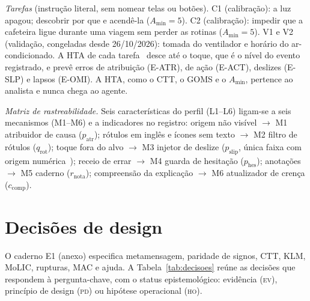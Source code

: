 \documentclass[conference]{IEEEtran}
\newcommand{\stEV}{\textsc{ev}}
\newcommand{\stPD}{\textsc{pd}}
\newcommand{\stHO}{\textsc{ho}}
\begin{document}
\textit{Tarefas} (instrução literal, sem nomear telas ou botões). C1 (calibração): a luz apagou; descobrir por que e acendê-la ($A_{\min}=5$). C2 (calibração): impedir que a cafeteira ligue durante uma viagem sem perder as rotinas ($A_{\min}=5$). V1 e V2 (validação, congeladas desde 26/10/2026): tomada do ventilador e horário do ar-condicionado. A HTA de cada tarefa~\cite{annett1967} desce até o toque, que é o nível do evento registrado, e prevê erros de atribuição (E-ATR), de ação (E-ACT), deslizes (E-SLP) e lapsos (E-OMI). A HTA, como o CTT, o GOMS e o $A_{\min}$, pertence ao analista e nunca chega ao agente.

\textit{Matriz de rastreabilidade.} Seis características do perfil (L1--L6) ligam-se a seis mecanismos (M1--M6) e a indicadores no registro: origem não visível $\rightarrow$ M1 atribuidor de causa ($p_{\mathrm{atr}}$); rótulos em inglês e ícones sem texto $\rightarrow$ M2 filtro de rótulos ($q_{\mathrm{rot}}$); toque fora do alvo $\rightarrow$ M3 injetor de deslize ($p_{\mathrm{slip}}$, única faixa com origem numérica~\cite[p.~93]{kobayashi2011}); receio de errar $\rightarrow$ M4 guarda de hesitação ($p_{\mathrm{hes}}$); anotações $\rightarrow$ M5 caderno ($r_{\mathrm{nota}}$); compreensão da explicação $\rightarrow$ M6 atualizador de crença ($c_{\mathrm{comp}}$).

\section{Decisões de design}
O caderno E1 (anexo) especifica metamensagem, paridade de signos, CTT, KLM, MoLIC, rupturas, MAC e ajuda. A Tabela~\ref{tab:decisoes} reúne as decisões que respondem à pergunta-chave, com o status epistemológico: evidência (\stEV), princípio de design (\stPD) ou hipótese operacional (\stHO).
\end{document}
